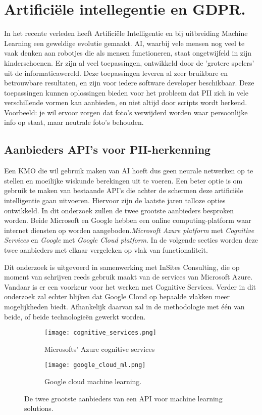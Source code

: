 \section{Artificiële intellegentie en GDPR.}
In het recente verleden heeft Artificiële Intelligentie en bij uitbreiding Machine Learning een geweldige evolutie gemaakt. AI, waarbij vele mensen nog veel te vaak denken aan robotjes die als mensen functioneren, staat ongetwijfeld in zijn kinderschoenen. Er zijn al veel toepassingen, ontwikkeld door de 'grotere spelers' uit de informaticawereld. Deze toepassingen leveren al zeer bruikbare en betrouwbare resultaten, en zijn voor iedere software developer beschikbaar. Deze toepassingen kunnen oplossingen bieden voor het probleem dat PII zich in vele verschillende vormen kan aanbieden, en niet altijd door scripts wordt herkend.  Voorbeeld: je wil ervoor zorgen dat foto's verwijderd worden waar persoonlijke info op staat, maar neutrale foto's behouden.

\subsection{Aanbieders API's voor PII-herkenning}
Een KMO die wil gebruik maken van AI hoeft dus geen neurale netwerken op te stellen en moeilijke wiskunde berekingen uit te voeren. Een beter optie is om gebruik te maken van bestaande API's die achter de schermen deze artificiële intelligentie gaan uitvoeren. Hiervoor zijn de laatste jaren talloze opties ontwikkeld. In dit onderzoek zullen de twee grootste aanbieders besproken worden. Beide Microsoft en Google hebben een online computing-platform waar internet diensten op worden aangeboden.\textit{Microsoft Azure platform} met \textit{Cognitive Services} en  \textit{Google} met \textit{Google Cloud platform}. In de volgende secties worden deze twee aanbieders met elkaar vergeleken op vlak van functionaliteit.

Dit onderzoek is uitgevoerd in samenwerking met InSites Consulting, die op moment van schrijven reeds gebruik maakt van de services van Microsoft Azure. Vandaar is er een voorkeur voor het werken met Cognitive Services. Verder in dit onderzoek zal echter blijken dat Google Cloud op bepaalde vlakken meer mogelijkheden biedt. Afhankelijk daarvan zal in de methodologie met één van beide, of beide technologieën gewerkt worden. 

\begin{figure}[h]
    \centering
    \begin{subfigure}{0.5\textwidth}
        \centering
        \texttt{[image: cognitive\_services.png]}
        \caption{Microsofts' Azure cognitive services}
        \label{fig:sub11}
    \end{subfigure}%
    \begin{subfigure}{0.5\textwidth}
        \centering
        \texttt{[image: google\_cloud\_ml.png]}
        \caption{Google cloud machine learning.}
        \label{fig:sub22}
    \end{subfigure}
    \caption{De twee grootste aanbieders van een API voor machine learning solutions.}
    \label{fig:test2}
\end{figure}

